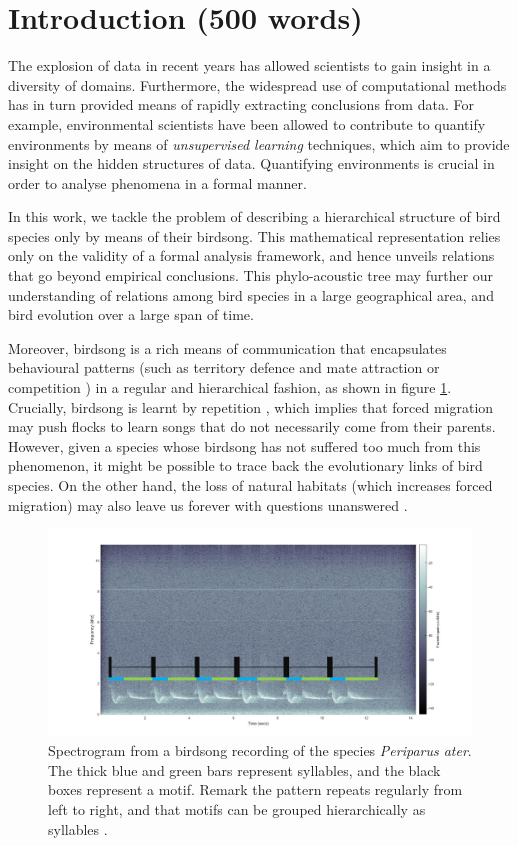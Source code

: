 \documentclass[pdftex,11pt,a4paper]{article}
\theoremstyle{definition}
\theoremstyle{remark}
\begin{document}
\section{Introduction (500 words)}
The explosion of data in recent years has allowed scientists to gain insight in a diversity of domains. Furthermore, the widespread use of computational methods has in turn provided means of rapidly extracting conclusions from data. For example, environmental scientists have been allowed to contribute to quantify environments by means of \emph{unsupervised learning} techniques, which aim to provide insight on the hidden structures of data. Quantifying environments is crucial in order to analyse phenomena in a formal manner.
\par In this work, we tackle the problem of describing a hierarchical structure of bird species only by means of their birdsong. This mathematical representation relies only on the validity of a formal analysis framework, and hence unveils relations that go beyond empirical conclusions. This phylo-acoustic tree may further our understanding of relations among bird species in a large geographical area, and bird evolution over a large span of time. 
\par Moreover, birdsong is a rich means of communication that encapsulates behavioural patterns (such as territory defence and mate attraction or competition \cite{Berwick2013, Naguib2014}) in a regular and hierarchical fashion, as shown in figure \ref{fig_birdsong_structure}. Crucially, birdsong is learnt by repetition \cite{Berwick2013}, which implies that forced migration may push flocks to learn songs that do not necessarily come from their parents. However, given a species whose birdsong has not suffered too much from this phenomenon, it might be possible to trace back the evolutionary links of bird species. On the other hand, the loss of natural habitats (which increases forced migration) may also leave us forever with questions unanswered \cite{Marler2004}.
\begin{figure}[t]
\centering
\includegraphics[width=\textwidth]{images/birdsong_structure}
\caption{Spectrogram from a birdsong recording of the species \emph{Periparus ater}. The thick blue and green bars represent syllables, and the black boxes represent a motif. Remark the pattern repeats regularly from left to right, and that motifs can be grouped hierarchically as syllables \cite{Snowdon2013}. }
\label{fig_birdsong_structure}
\end{figure}
\end{document}

